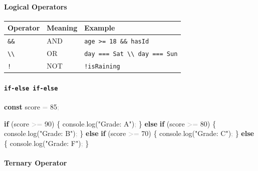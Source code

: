 \documentclass[
  justified,
  openright,
]{tufte-book}
\let\subsection\paragraph
\let\paragraph\paragraph
\newcommand{\KeywordTok}[1]{\textcolor{CodeKeyword}{\textbf{#1}}}  %
\newcommand{\StringTok}[1]{\textcolor{CodeString}{#1}}              %
\newcommand{\CodeNumTok}[1]{\textcolor{CodeNumber}{#1}}             %
\newcommand{\CodeFuncTok}[1]{\textcolor{CodeKeyword}{#1}}           %
\newcommand{\OperatorTok}[1]{\textcolor{DarkGray}{#1}}              %
\newenvironment{Shaded}{%
  \begin{mdframed}[style=TufteCode]%
}{%
  \end{mdframed}%
}
\let\subsection\paragraph
\let\paragraph\paragraph
\begin{document}
\subsection{Logical Operators}\label{logical-operators}

\begin{fullwidth}{\def\LTcaptype{none} %
\begin{longtable}[]{@{}lll@{}}
\toprule\noalign{}
Operator & Meaning & Example \\
\midrule\noalign{}
\endhead
\bottomrule\noalign{}
\endlastfoot
\texttt{\&\&} & AND & \texttt{age\ \textgreater{}=\ 18\ \&\&\ hasId} \\
\texttt{\textbackslash{}\textbar{}\textbackslash{}\textbar{}} & OR &
\texttt{day\ ===\ \textquotesingle{}Sat\textquotesingle{}\ \textbackslash{}\textbar{}\textbackslash{}\textbar{}\ day\ ===\ \textquotesingle{}Sun\textquotesingle{}} \\
\texttt{!} & NOT & \texttt{!isRaining} \\
\end{longtable}
}
\end{fullwidth}

\subsection{\texorpdfstring{\texttt{if-else\ if-else}}{if-else if-else}}\label{if-else-if-else}

\begin{Shaded}
\begin{Highlighting}[]
\KeywordTok{const} score \OperatorTok{=} \CodeNumTok{85}\OperatorTok{;}
 
\KeywordTok{if} (score \OperatorTok{\textgreater{}=} \CodeNumTok{90}) \{
  console\OperatorTok{.}\CodeFuncTok{log}(\StringTok{"Grade: A"})\OperatorTok{;}
\} \KeywordTok{else} \KeywordTok{if} (score \OperatorTok{\textgreater{}=} \CodeNumTok{80}) \{
  console\OperatorTok{.}\CodeFuncTok{log}(\StringTok{"Grade: B"})\OperatorTok{;}
\} \KeywordTok{else} \KeywordTok{if} (score \OperatorTok{\textgreater{}=} \CodeNumTok{70}) \{
  console\OperatorTok{.}\CodeFuncTok{log}(\StringTok{"Grade: C"})\OperatorTok{;}
\} \KeywordTok{else} \{
  console\OperatorTok{.}\CodeFuncTok{log}(\StringTok{"Grade: F"})\OperatorTok{;}
\}
\end{Highlighting}
\end{Shaded}

\subsection{Ternary Operator}\label{ternary-operator}
\end{document}

